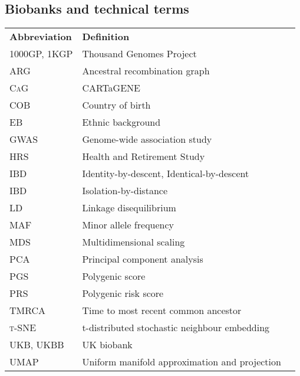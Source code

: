 
\subsection*{Biobanks and technical terms}

\begin{table}[!h]
\hspace{1.0cm}
\begin{tabular}{l l r}

\textbf{Abbreviation} & \textbf{Definition} \\ [1ex]
\textsc{1000GP, 1KGP}  &  Thousand Genomes Project \\ [1ex]
\textsc{ARG}  &  Ancestral recombination graph \\ [1ex]
\textsc{CaG}  &  CARTaGENE \\ [1ex]
\textsc{COB}  &  Country of birth \\ [1ex]
\textsc{EB}  &  Ethnic background \\ [1ex]
\textsc{GWAS}  &  Genome-wide association study \\ [1ex]
\textsc{HRS}  &  Health and Retirement Study \\ [1ex]
\textsc{IBD}  &  Identity-by-descent, Identical-by-descent\\ [1ex]
\textsc{IBD}  &  Isolation-by-distance \\ [1ex]
\textsc{LD}  &  Linkage disequilibrium \\ [1ex]
\textsc{MAF}  &  Minor allele frequency \\ [1ex]
\textsc{MDS}  &  Multidimensional scaling \\ [1ex]
\textsc{PCA}  & Principal component analysis \\ [1ex]
\textsc{PGS}  &  Polygenic score \\ [1ex]
\textsc{PRS}  &  Polygenic risk score \\ [1ex]
\textsc{TMRCA}  &  Time to most recent common ancestor \\ [1ex]
\textsc{{t}-SNE}  &  t-distributed stochastic neighbour embedding \\ [1ex]
\textsc{UKB, UKBB}  &  UK biobank \\ [1ex]
\textsc{UMAP}  &  Uniform manifold approximation and projection \\ [1ex]

\end{tabular}
\end{table}

